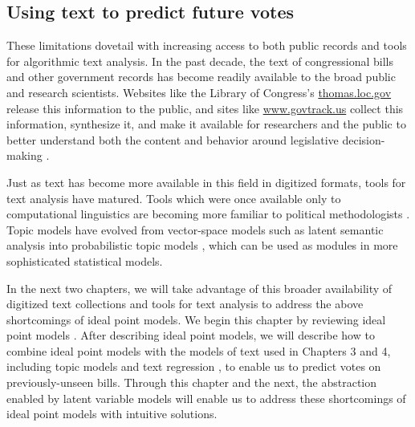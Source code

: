 

\subsection*{Using text to predict future votes}

These limitations dovetail with increasing access to both public
records and tools for algorithmic text analysis.  In the past decade,
the text of congressional bills and other government records has
become readily available to the broad public and research scientists.
Websites like the Library of Congress's \url{thomas.loc.gov} release
this information to the public, and sites like \url{www.govtrack.us}
collect this information, synthesize it, and make it available for
researchers and the public to better understand both the content and
behavior around legislative decision-making \citep{govtrack:2009}.

Just as text has become more available in this field in digitized
formats, tools for text analysis have matured.  Tools which were once
available only to computational linguistics are becoming more familiar
to political methodologists \citep{zimmer:2012}.  Topic models have
evolved from vector-space models such as latent semantic analysis
\citep{deerwester:1990} into probabilistic topic models
\citep{hofmann:1999,blei:2003}, which can be used as modules in more
sophisticated statistical models.

In the next two chapters, we will take advantage of this broader
availability of digitized text collections and tools for text analysis
to address the above shortcomings of ideal point models.  We begin this
chapter by reviewing ideal point models
\citep{poole:1985,poole:1991,jackman:2001,martin:2002,clinton:2004}.
After describing ideal point models, we will describe how to combine
ideal point models with the models of text used in Chapters 3 and 4,
including topic models \citep{blei:2003} and text regression \citep{kogan:2009}, to
enable us to predict votes on previously-unseen bills.  Through this
chapter and the next, the abstraction enabled by latent variable
models will enable us to address these shortcomings of ideal point
models with intuitive solutions.

